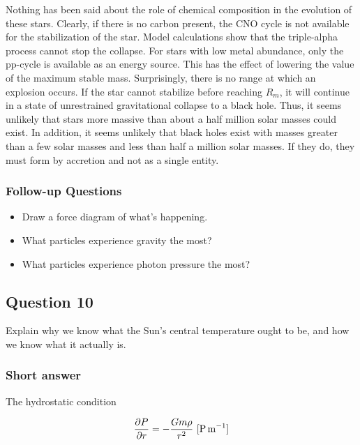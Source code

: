 \documentclass[a4paper,10pt]{article}
\begin{document}
{\noindent}Nothing has been said about the role of chemical composition in the evolution of these stars. Clearly, if there is no carbon present, the CNO cycle is not available for the stabilization of the star. Model calculations show that the triple-alpha process cannot stop the collapse. For stars with low metal abundance, only the pp-cycle is available as an energy source. This has the effect of lowering the value of the maximum stable mass. Surprisingly, there is no range at which an explosion occurs. If the star cannot stabilize before reaching $R_m$, it will continue in a state of unrestrained gravitational collapse to a black hole. Thus, it seems unlikely that stars more massive than about a half million solar masses could exist. In addition, it seems unlikely that black holes exist with masses greater than a few solar masses and less than half a million solar masses. If they do, they must form by accretion and not as a single entity.

\subsubsection{Follow-up Questions}

\begin{itemize}
    \item Draw a force diagram of what's happening.
    \item What particles experience gravity the most?
    \item What particles experience photon pressure the most?
\end{itemize}


\newpage
\subsection{Question 10}

Explain why we know what the Sun's central temperature ought to be, and how we know what it actually is.

\subsubsection{Short answer}

The hydrostatic condition

\begin{align*}
    \frac{\partial P}{\partial r} = -\frac{Gm\rho}{r^2} ~ [{\rm P\,m^{-1}}]
\end{align*}
\end{document}
